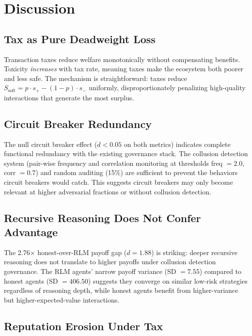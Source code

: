 \documentclass[11pt]{article}
\begin{document}
\section{Discussion}

\subsection{Tax as Pure Deadweight Loss}

Transaction taxes reduce welfare monotonically without compensating benefits. Toxicity \emph{increases} with tax rate, meaning taxes make the ecosystem both poorer and less safe. The mechanism is straightforward: taxes reduce $S_{\text{soft}} = p \cdot s_+ - (1-p) \cdot s_-$ uniformly, disproportionately penalizing high-quality interactions that generate the most surplus.

\subsection{Circuit Breaker Redundancy}

The null circuit breaker effect ($d < 0.05$ on both metrics) indicates complete functional redundancy with the existing governance stack. The collusion detection system (pair-wise frequency and correlation monitoring at thresholds freq $= 2.0$, corr $= 0.7$) and random auditing (15\%) are sufficient to prevent the behaviors circuit breakers would catch. This suggests circuit breakers may only become relevant at higher adversarial fractions or without collusion detection.

\subsection{Recursive Reasoning Does Not Confer Advantage}

The 2.76$\times$ honest-over-RLM payoff gap ($d = 1.88$) is striking: deeper recursive reasoning does not translate to higher payoffs under collusion detection governance. The RLM agents' narrow payoff variance (SD $= 7.55$) compared to honest agents (SD $= 406.50$) suggests they converge on similar low-risk strategies regardless of reasoning depth, while honest agents benefit from higher-variance but higher-expected-value interactions.

\subsection{Reputation Erosion Under Tax}
\end{document}
